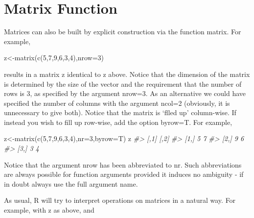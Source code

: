 \documentclass[
]{book}
\newenvironment{Shaded}{\begin{snugshade}}{\end{snugshade}}
\newcommand{\AttributeTok}[1]{\textcolor[rgb]{0.77,0.63,0.00}{#1}}
\newcommand{\CommentTok}[1]{\textcolor[rgb]{0.56,0.35,0.01}{\textit{#1}}}
\newcommand{\DecValTok}[1]{\textcolor[rgb]{0.00,0.00,0.81}{#1}}
\newcommand{\FunctionTok}[1]{\textcolor[rgb]{0.00,0.00,0.00}{#1}}
\newcommand{\NormalTok}[1]{#1}
\newcommand{\OtherTok}[1]{\textcolor[rgb]{0.56,0.35,0.01}{#1}}
\begin{document}
\hypertarget{matrix-function}{%
\section{Matrix Function}\label{matrix-function}}

Matrices can also be built by explicit construction via the function matrix. For example,

\begin{Shaded}
\begin{Highlighting}[]
\NormalTok{z}\OtherTok{\textless{}{-}}\FunctionTok{matrix}\NormalTok{(}\FunctionTok{c}\NormalTok{(}\DecValTok{5}\NormalTok{,}\DecValTok{7}\NormalTok{,}\DecValTok{9}\NormalTok{,}\DecValTok{6}\NormalTok{,}\DecValTok{3}\NormalTok{,}\DecValTok{4}\NormalTok{),}\AttributeTok{nrow=}\DecValTok{3}\NormalTok{)}
\end{Highlighting}
\end{Shaded}

results in a matrix z identical to z above. Notice that the dimension of the matrix is determined by the size of the vector and the requirement that the number of rows is 3, as specified by the argument nrow=3. As an alternative we could have specified the number of columns with the argument ncol=2 (obviously, it is unnecessary to give both). Notice that the matrix is `flled up' column-wise. If instead you wish to fill up row-wise, add the option byrow=T. For example,

\begin{Shaded}
\begin{Highlighting}[]
\NormalTok{z}\OtherTok{\textless{}{-}}\FunctionTok{matrix}\NormalTok{(}\FunctionTok{c}\NormalTok{(}\DecValTok{5}\NormalTok{,}\DecValTok{7}\NormalTok{,}\DecValTok{9}\NormalTok{,}\DecValTok{6}\NormalTok{,}\DecValTok{3}\NormalTok{,}\DecValTok{4}\NormalTok{),}\AttributeTok{nr=}\DecValTok{3}\NormalTok{,}\AttributeTok{byrow=}\NormalTok{T)}
\NormalTok{z}
\CommentTok{\#\textgreater{}      [,1] [,2]}
\CommentTok{\#\textgreater{} [1,]    5    7}
\CommentTok{\#\textgreater{} [2,]    9    6}
\CommentTok{\#\textgreater{} [3,]    3    4}
\end{Highlighting}
\end{Shaded}

Notice that the argument nrow has been abbreviated to nr. Such abbreviations are always possible for function arguments provided it induces no ambiguity - if in doubt always use the full argument name.

As usual, R will try to interpret operations on matrices in a natural way. For example, with z as above, and
\end{document}
